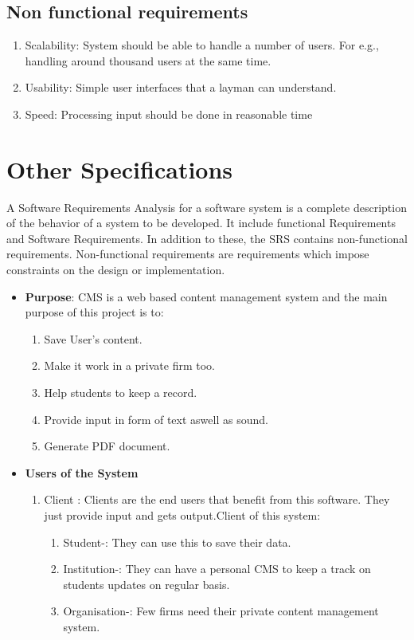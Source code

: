\begin{itemize}
\begin{enumerate}
\end{enumerate}
\vskip 0.5cm
\subsection{Non functional requirements}
\begin{enumerate} 
\item Scalability: System should be able to handle a number of users. 
For e.g., handling around thousand users at the same time.
\item Usability: Simple user interfaces that a layman can understand.
\item Speed: Processing input should be done in reasonable time
\end{enumerate}
\end{itemize}


\section{Other Specifications}

A Software Requirements Analysis for a software system is a complete 
description of the behavior of a system to be developed. It include functional Requirements
and Software Requirements. In addition to these, the SRS contains 
non-functional requirements. Non-functional requirements are 
requirements which impose constraints on the design or implementation.
\begin{itemize}
\item{\bf Purpose}: CMS is a web based content management system and the main purpose of this project is to:
\begin{enumerate}
\item Save User's content.
\item Make it work in a private firm too.
\item Help students to keep a record.
\item Provide input in form of text aswell as sound.
\item Generate PDF document.
\end{enumerate}

\item{\bf Users of the System}
\begin{enumerate} 
\item Client : Clients are the end users that benefit from this software.
They just provide input and gets output.Client of this system:
\begin{enumerate}
\item Student-: They can use this to save their data. 
\item Institution-: They can have a personal CMS to keep a track on students updates on regular basis.
\item Organisation-: Few firms need their private content management system.
\end{enumerate}
\end{enumerate}
\end{itemize}


